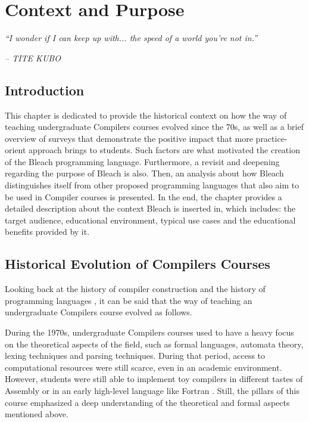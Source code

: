 \chapter{Context and Purpose} \label{cap:metodologia}

\begin{displayquote}
    \begin{center}
        \textit{``I wonder if I can keep up with... the speed of a world you're not in.''}
    \end{center}
\end{displayquote}

\begin{flushright}
   \textit{-- TITE KUBO}
\end{flushright}

\section{Introduction}
This chapter is dedicated to provide the historical context on how the way of teaching undergraduate Compilers courses evolved since the 70s, as well as a brief overview of surveys that demonstrate the positive impact that more practice-orient approach brings to students. Such factors are what motivated the creation of the Bleach programming language. Furthermore, a revisit and deepening regarding the purpose of Bleach is also. Then, an analysis about how Bleach distinguishes itself from other proposed programming languages that also aim to be used in Compiler courses is presented. In the end, the chapter provides a detailed description about the context Bleach is inserted in, which includes: the target audience, educational environment, typical use cases and the educational benefits provided by it.

\section{Historical Evolution of Compilers Courses}
Looking back at the history of compiler construction \cite{wikipedia_compiler_construction} and the history of programming languages \cite{wikipedia_programming_languages}, it can be said that the way of teaching an undergraduate Compilers course evolved as follows.

During the 1970s, undergraduate Compilers courses used to have a heavy focus on the theoretical aspects of the field, such as formal languages, automata theory, lexing techniques and parsing techniques. During that period, access to computational resources were still scarce, even in an academic environment. However, students were still able to implement toy compilers in different tastes of Assembly or in an early high-level language like Fortran \cite{fortran_official_website}. Still, the pillars of this course emphasized a deep understanding of the theoretical and formal aspects mentioned above.

